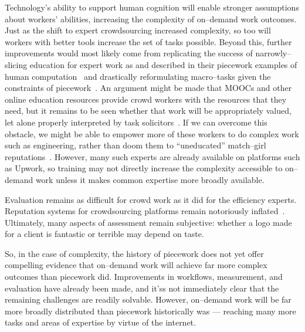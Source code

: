 \documentclass[pn4226]{subfiles}
\begin{document}
Technology's ability to support human cognition will enable stronger assumptions about workers' abilities, increasing the complexity of on--demand work outcomes.
Just as the shift to expert crowdsourcing increased complexity, so too will workers with better tools increase the set of tasks possible.
Beyond this, further improvements would most likely come from replicating the success of narrowly--slicing education for expert work as \citeauthor{hart2013rise} and \citeauthor{grier2013computers} described in their piecework examples
of human computation~\cite{grier2013computers} and
drastically reformulating macro--tasks given the constraints of piecework~\cite{hart2013rise}.
An argument might be made that
MOOCs and other online education resources
provide crowd workers with the resources that they need, but 
it remains to be seen whether that work will be appropriately valued, let alone
properly interpreted by task solicitors~\cite{aguaded2013mooc}.
If we can overcome this obstacle,
we might be able to empower more of these workers to do complex work such as engineering,
rather than doom them to ``uneducated'' match--girl reputations~\cite{10.2307/3827491}.
However, many such experts are already available on platforms such as Upwork, so training may not directly increase the complexity accessible to on--demand work unless it makes common expertise more broadly available.

Evaluation remains as difficult for crowd work as it did for the efficiency experts. 
Reputation systems for crowdsourcing platforms remain notoriously inflated~\cite{Horton2015a}.
Ultimately, many aspects of assessment remain subjective: whether a logo made for a client is fantastic or terrible may depend on taste.

So, in the case of complexity, the history of piecework does not yet offer compelling evidence that on--demand work will achieve far more complex outcomes than piecework did.
Improvements in workflows, measurement, and evaluation have already been made, and it'ss not immediately clear that the remaining challenges are readily solvable.
However, on--demand work will be far more broadly distributed than piecework historically was
--- reaching many more tasks and areas of expertise by virtue of the internet.
\end{document}
